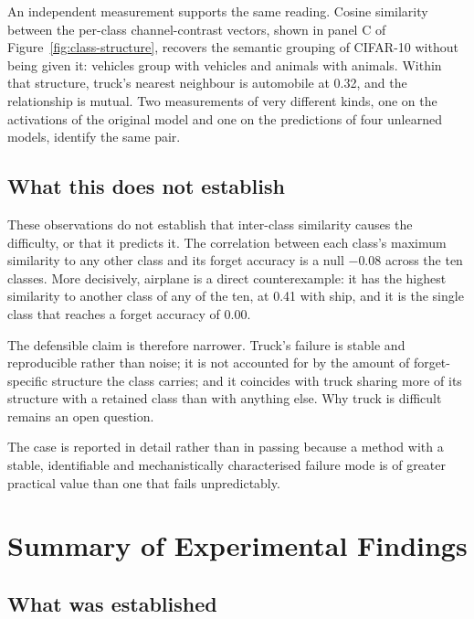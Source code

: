 An independent measurement supports the same reading. Cosine similarity between
the per-class channel-contrast vectors, shown in panel C of
Figure~\ref{fig:class-structure}, recovers the semantic grouping of CIFAR-10
without being given it: vehicles group with vehicles and animals with animals.
Within that structure, truck's nearest neighbour is automobile at 0.32, and the
relationship is mutual. Two measurements of very different kinds, one on the
activations of the original model and one on the predictions of four unlearned
models, identify the same pair.

\subsection{What this does not establish}

These observations do not establish that inter-class similarity causes the
difficulty, or that it predicts it. The correlation between each class's maximum
similarity to any other class and its forget accuracy is a null $-0.08$ across the
ten classes. More decisively, airplane is a direct counterexample: it has the
highest similarity to another class of any of the ten, at 0.41 with ship, and it is
the single class that reaches a forget accuracy of 0.00.

The defensible claim is therefore narrower. Truck's failure is stable and
reproducible rather than noise; it is not accounted for by the amount of
forget-specific structure the class carries; and it coincides with truck sharing
more of its structure with a retained class than with anything else. Why truck is
difficult remains an open question.

The case is reported in detail rather than in passing because a method with a
stable, identifiable and mechanistically characterised failure mode is of greater
practical value than one that fails unpredictably.

\section{Summary of Experimental Findings}
\label{sec:exp-summary}

\subsection{What was established}

